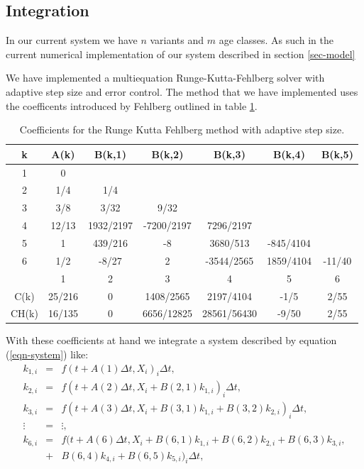 \documentclass[a4paper,12pt]{article}
\begin{document}
\subsection{Integration}
In our current system we have $n$ variants and $m$ age classes. As
such in the current numerical implementation of our system described
in section \ref{sec-model} 

We have implemented a multiequation Runge-Kutta-Fehlberg solver with adaptive
step size and error control. The method that we have implemented uses
the coefficents introduced by Fehlberg outlined in table
\ref{tab-fehlberg}.
\begin{table}
  \begin{tabular}{c|cccccc}
    k & A(k) & B(k,1) & B(k,2) & B(k,3) & B(k,4) & B(k,5) \\
    \hline
    1 & 0 & & & & & \\
    2 & 1/4 & 1/4 & & & &  \\
    3 & 3/8 & 3/32 & 9/32 & & & \\
    4 & 12/13 & 1932/2197 & -7200/2197 & 7296/2197 & & \\
    5 & 1 & 439/216 & -8 & 3680/513 & -845/4104 &  \\
    6 & 1/2 & -8/27 & 2 & -3544/2565 & 1859/4104 & -11/40 \\
    \hline
    & 1 & 2 & 3 & 4 & 5 & 6 \\
    \hline
    C(k) & 25/216 & 0 & 1408/2565 & 2197/4104 & -1/5 & 2/55 \\
    CH(k) & 16/135 & 0 & 6656/12825 & 28561/56430 & -9/50 & 2/55 
  \end{tabular}
  \caption{Coefficients for the Runge Kutta Fehlberg method with
    adaptive step size.}
  \label{tab-fehlberg}
\end{table}
With these coefficients at hand we integrate a system
described by equation (\ref{eqn-system}) like:
\begin{eqnarray}
  k_{1,i}& = &f(t + A(1)\Delta t,X_i)_i\Delta t, \\
  k_{2,i}& = &f(t + A(2)\Delta t,X_i + B(2,1)k_{1,i})_i\Delta t,  \\
  k_{3,i}& = &f(t + A(3)\Delta t,X_i + B(3,1)k_{1,i} + B(3,2)k_{2,i})_i\Delta t, \\
  \vdots& = &\vdots, \\                   
  k_{6,i}& = &f(t + A(6)\Delta t,X_i + B(6,1)k_{1,i} + B(6,2)k_{2,i} +
  B(6,3)k_{3,i}, \nonumber \\
  &+& B(6,4)k_{4,i}+ B(6,5)k_{5,i})_i \Delta t,
\end{eqnarray}
\end{document}

